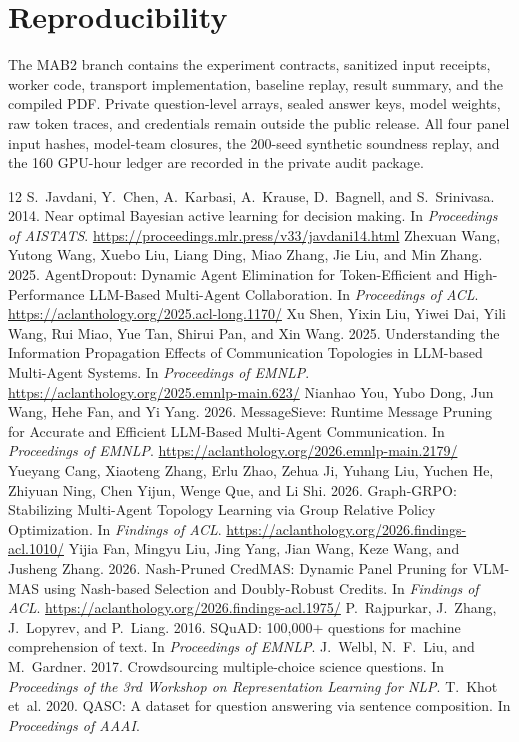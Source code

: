 \documentclass[11pt]{article}
\begin{document}
\section*{Reproducibility}
The MAB2 branch contains the experiment contracts, sanitized input receipts, worker code, transport implementation, baseline replay, result summary, and the compiled PDF. Private question-level arrays, sealed answer keys, model weights, raw token traces, and credentials remain outside the public release. All four panel input hashes, model-team closures, the 200-seed synthetic soundness replay, and the 160 GPU-hour ledger are recorded in the private audit package.

\begin{thebibliography}{12}
 S.~Javdani, Y.~Chen, A.~Karbasi, A.~Krause, D.~Bagnell, and S.~Srinivasa. 2014. Near optimal Bayesian active learning for decision making. In \emph{Proceedings of AISTATS}. \url{https://proceedings.mlr.press/v33/javdani14.html}
 Zhexuan Wang, Yutong Wang, Xuebo Liu, Liang Ding, Miao Zhang, Jie Liu, and Min Zhang. 2025. AgentDropout: Dynamic Agent Elimination for Token-Efficient and High-Performance LLM-Based Multi-Agent Collaboration. In \emph{Proceedings of ACL}. \url{https://aclanthology.org/2025.acl-long.1170/}
 Xu Shen, Yixin Liu, Yiwei Dai, Yili Wang, Rui Miao, Yue Tan, Shirui Pan, and Xin Wang. 2025. Understanding the Information Propagation Effects of Communication Topologies in LLM-based Multi-Agent Systems. In \emph{Proceedings of EMNLP}. \url{https://aclanthology.org/2025.emnlp-main.623/}
 Nianhao You, Yubo Dong, Jun Wang, Hehe Fan, and Yi Yang. 2026. MessageSieve: Runtime Message Pruning for Accurate and Efficient LLM-Based Multi-Agent Communication. In \emph{Proceedings of EMNLP}. \url{https://aclanthology.org/2026.emnlp-main.2179/}
 Yueyang Cang, Xiaoteng Zhang, Erlu Zhao, Zehua Ji, Yuhang Liu, Yuchen He, Zhiyuan Ning, Chen Yijun, Wenge Que, and Li Shi. 2026. Graph-GRPO: Stabilizing Multi-Agent Topology Learning via Group Relative Policy Optimization. In \emph{Findings of ACL}. \url{https://aclanthology.org/2026.findings-acl.1010/}
 Yijia Fan, Mingyu Liu, Jing Yang, Jian Wang, Keze Wang, and Jusheng Zhang. 2026. Nash-Pruned CredMAS: Dynamic Panel Pruning for VLM-MAS using Nash-based Selection and Doubly-Robust Credits. In \emph{Findings of ACL}. \url{https://aclanthology.org/2026.findings-acl.1975/}
 P.~Rajpurkar, J.~Zhang, J.~Lopyrev, and P.~Liang. 2016. SQuAD: 100,000+ questions for machine comprehension of text. In \emph{Proceedings of EMNLP}.
 J.~Welbl, N.~F.~Liu, and M.~Gardner. 2017. Crowdsourcing multiple-choice science questions. In \emph{Proceedings of the 3rd Workshop on Representation Learning for NLP}.
 T.~Khot et~al. 2020. QASC: A dataset for question answering via sentence composition. In \emph{Proceedings of AAAI}.
\end{thebibliography}
\end{document}
